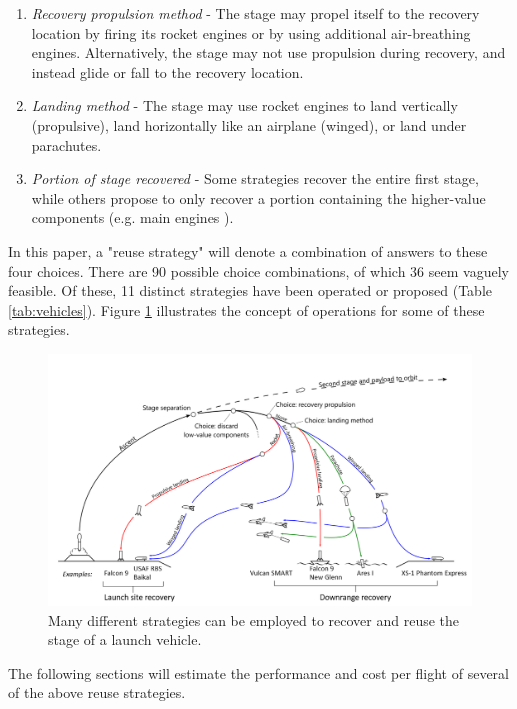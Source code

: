 \documentclass[conf]{new-aiaa}
\begin{document}
\begin{multicols}{2}
\begin{enumerate}
    \item \textit{Recovery propulsion method} - The stage may propel itself to the recovery location by firing its rocket engines or by using additional air-breathing engines. Alternatively, the stage may not use propulsion during recovery, and instead glide or fall to the recovery location.

    \item \textit{Landing method} - The stage may use rocket engines to land vertically (propulsive), land horizontally like an airplane (winged), or land under parachutes.

    \item \textit{Portion of  stage recovered} - Some strategies recover the entire first stage, while others propose to only recover a portion containing the higher-value components (e.g. main engines \cite{Ragab2015}).
\end{enumerate}

In this paper, a "reuse strategy" will denote a combination of answers to these four choices. There are 90 possible choice combinations, of which 36 seem vaguely feasible. Of these, 11 distinct strategies have been operated or proposed (Table \ref{tab:vehicles}). Figure \ref{fig:recov_strat_diagram} illustrates the concept of operations for some of these strategies.

\begin{figure}
    \centering
    \includegraphics[width=1\textwidth]{figures/recovery_options_annotated}
    \caption{\label{fig:recov_strat_diagram} Many different strategies can be employed to recover and reuse the  stage of a launch vehicle.}
\end{figure}

The following sections will estimate the performance and cost per flight of several of the above reuse strategies.


\end{multicols}
\end{document}
